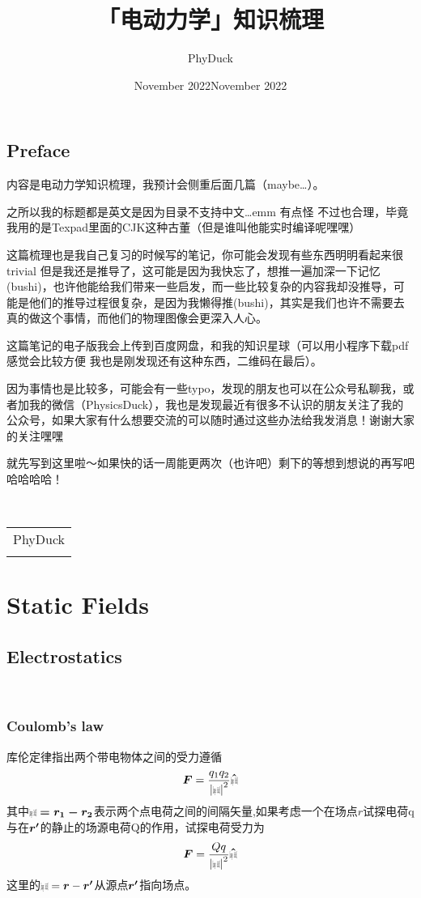 \documentclass[14pt,oneside]{book}
\title{「电动力学」知识梳理}
\author{PhyDuck}
\date{November 2022}
\def\br{{\mbox{$\resizebox{.09in}{.08in}{\texttt{[image: BoldR]}}$}}}
\newcommand{\hr}{\hat{\br}}
\begin{document}
\begin{large}
\maketitle
\chapter*{Preface}

内容是电动力学知识梳理，我预计会侧重后面几篇（maybe…）。

之所以我的标题都是英文是因为目录不支持中文…emm 有点怪 不过也合理，毕竟我用的是Texpad里面的CJK这种古董（但是谁叫他能实时编译呢嘿嘿）

这篇梳理也是我自己复习的时候写的笔记，你可能会发现有些东西明明看起来很trivial 但是我还是推导了，这可能是因为我快忘了，想推一遍加深一下记忆(bushi)，也许他能给我们带来一些启发，而一些比较复杂的内容我却没推导，可能是他们的推导过程很复杂，是因为我懒得推(bushi)，其实是我们也许不需要去真的做这个事情，而他们的物理图像会更深入人心。

这篇笔记的电子版我会上传到百度网盘，和我的知识星球（可以用小程序下载pdf 感觉会比较方便 我也是刚发现还有这种东西，二维码在最后）。

因为事情也是比较多，可能会有一些typo，发现的朋友也可以在公众号私聊我，或者加我的微信（PhysicsDuck），我也是发现最近有很多不认识的朋友关注了我的公众号，如果大家有什么想要交流的可以随时通过这些办法给我发消息！谢谢大家的关注嘿嘿

就先写到这里啦～如果快的话一周能更两次（也许吧）剩下的等想到想说的再写吧哈哈哈哈！

~\\
\begin{flushright}
    \begin{tabular}{c}
        PhyDuck\\
        \date{November 2022}
    \end{tabular}
\end{flushright}
\tableofcontents
\setcounter{page}{0} 
\newpage



\part{Static Fields}
\chapter{Electrostatics}\
\section{Coulomb's law}
库伦定律指出两个带电物体之间的受力遵循
\begin{equation}
  \vb*{F}=\frac{q_1 q_2}{\abs{\br}^2} \vb*{\hr}
\end{equation}
其中$\br\vb*{=r_1-r_2}$表示两个点电荷之间的间隔矢量,如果考虑一个在场点$r$试探电荷q与在$\vb*{r'}$的静止的场源电荷Q的作用，试探电荷受力为
\begin{equation}
    \vb*{F}=\frac{Qq}{\abs{\br}^2} \vb*{\hr}
\end{equation}这里的$\br=\vb*{r}-\vb*{r'}$从源点$\vb*{r'}$指向场点。


\end{large}
\end{document}
